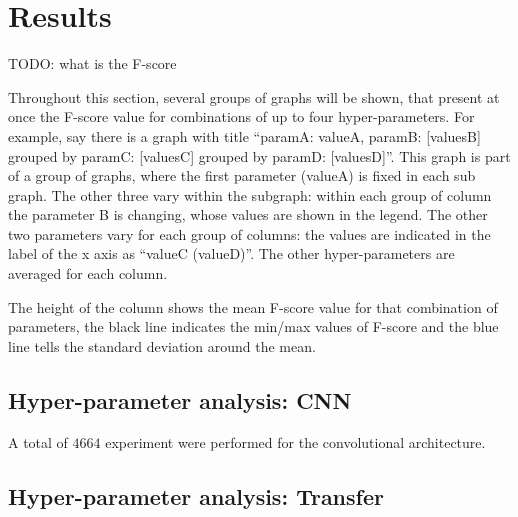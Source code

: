 
\section{Results}
\label{sec:results}

TODO: what is the F-score

Throughout this section, several groups of graphs will be shown, that present
at once the F-score value for combinations of up to four hyper-parameters.
For example, say there is a graph 
with title 
``paramA: valueA, paramB: [valuesB]
grouped by paramC: [valuesC]
grouped by paramD: [valuesD]''.
This graph is part of a group of graphs, where the first parameter
(valueA) is fixed in each sub graph.
The other three vary within the subgraph:
within each group of column the parameter B is changing,
whose values are shown in the legend.
The other two parameters vary for each group of columns:
the values are indicated in the label of the x axis as ``valueC (valueD)''.
The other hyper-parameters are averaged for each column.

The height of the column shows the mean F-score value for that
combination of parameters,
the black line indicates the min/max values of F-score and the
blue line tells the standard deviation around the mean.

\subsection{Hyper-parameter analysis: CNN}


A total of $4664$ experiment were performed for the convolutional architecture.

\subsection{Hyper-parameter analysis: Transfer}

